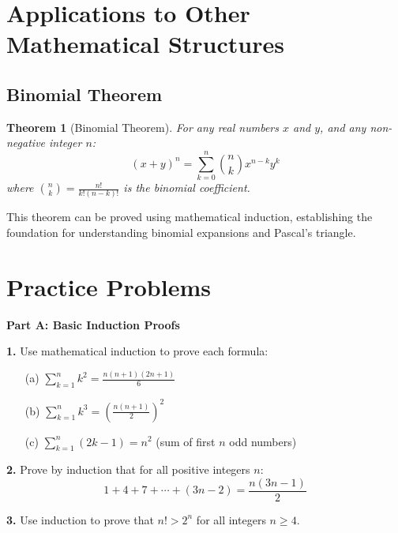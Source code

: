 \documentclass[12pt]{article}
\newtheorem{theorem}{Theorem}
\begin{document}
\section{Applications to Other Mathematical Structures}

\subsection{Binomial Theorem}

\begin{theorem}[Binomial Theorem]
For any real numbers $x$ and $y$, and any non-negative integer $n$:
$$(x + y)^n = \sum_{k=0}^{n} \binom{n}{k} x^{n-k} y^k$$
where $\binom{n}{k} = \frac{n!}{k!(n-k)!}$ is the binomial coefficient.
\end{theorem}

This theorem can be proved using mathematical induction, establishing the foundation for understanding binomial expansions and Pascal's triangle.

\newpage

\section{Practice Problems}

\textbf{Part A: Basic Induction Proofs}

\textbf{1.} Use mathematical induction to prove each formula:

\begin{enumerate}
\item[(a)] $\sum_{k=1}^{n} k^2 = \frac{n(n+1)(2n+1)}{6}$
\vspace{4cm}

\item[(b)] $\sum_{k=1}^{n} k^3 = \left(\frac{n(n+1)}{2}\right)^2$
\vspace{4cm}

\item[(c)] $\sum_{k=1}^{n} (2k-1) = n^2$ (sum of first $n$ odd numbers)
\vspace{4cm}
\end{enumerate}

\textbf{2.} Prove by induction that for all positive integers $n$:
$$1 + 4 + 7 + \cdots + (3n-2) = \frac{n(3n-1)}{2}$$
\vspace{5cm}

\textbf{3.} Use induction to prove that $n! > 2^n$ for all integers $n \geq 4$.
\vspace{5cm}
\end{document}
